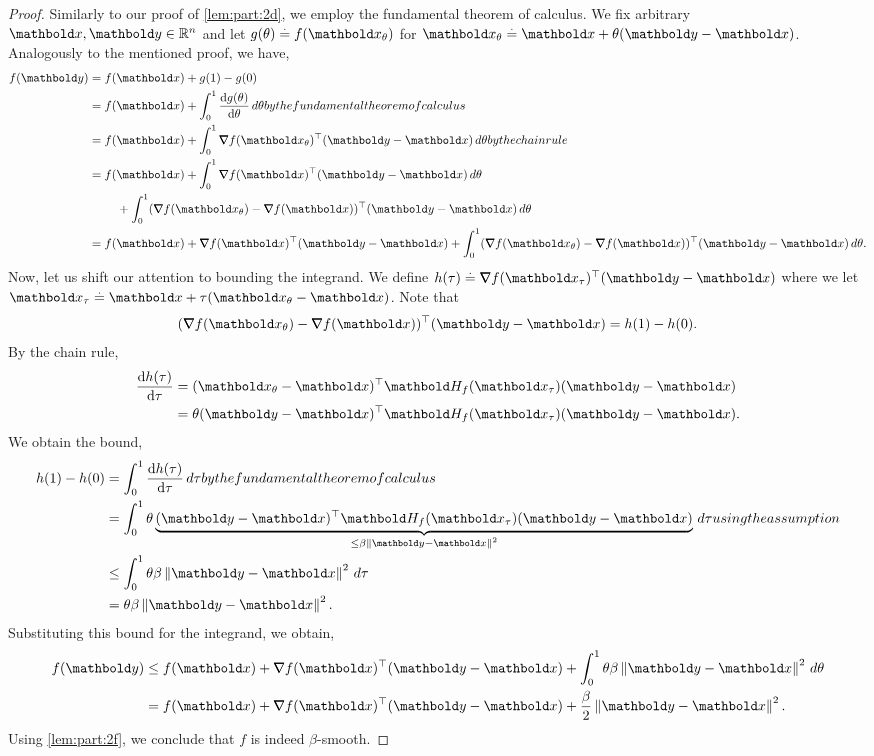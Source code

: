 \documentclass{tufte-handout}
\begin{document}
\begin{proof}
Similarly to our proof of \cref{lem:part:2d}, we employ the fundamental theorem of calculus. We fix arbitrary $\vx, \vy \in \R^n$ and let $g(\theta) \defeq f(\vx_\theta)$ for $\vx_\theta \defeq \vx + \theta(\vy - \vx)$. Analogously to the mentioned proof, we have, \begin{align*}
    f(\vy) &= f(\vx) + g(1) - g(0) \\
    &= f(\vx) + \int_0^1 \odv{g(\theta)}{\theta} \,d\theta \margintag{by the fundamental theorem of calculus} \\
    &= f(\vx) + \int_0^1 \trans{\grad f(\vx_\theta)}(\vy - \vx) \,d\theta \margintag{by the chain rule} \\
    &= \begin{multlined}[t]
        f(\vx) + \int_0^1 \trans{\grad f(\vx)}(\vy - \vx) \,d\theta \\ + \int_0^1 \trans{(\grad f(\vx_\theta) - \grad f(\vx))}(\vy - \vx) \,d\theta
    \end{multlined} \\
    &= f(\vx) + \trans{\grad f(\vx)}(\vy - \vx) + \int_0^1 \trans{(\grad f(\vx_\theta) - \grad f(\vx))}(\vy - \vx) \,d\theta.
\end{align*} Now, let us shift our attention to bounding the integrand. We define $h(\tau) \defeq \trans{\grad f(\vx_\tau)}(\vy - \vx)$ where we let $\vx_\tau \defeq \vx + \tau(\vx_\theta - \vx)$. Note that \begin{align*}
    \trans{(\grad f(\vx_\theta) - \grad f(\vx))}(\vy - \vx) = h(1) - h(0).
\end{align*} By the chain rule, \begin{align*}
    \odv{h(\tau)}{\tau} &= \trans{(\vx_\theta - \vx)} \mH_f(\vx_\tau) (\vy - \vx) \\
    &= \theta\trans{(\vy-\vx)} \mH_f(\vx_\tau) (\vy - \vx).
\end{align*} We obtain the bound, \begin{align*}
    h(1) - h(0) &= \int_0^1 \odv{h(\tau)}{\tau} \,d\tau \margintag{by the fundamental theorem of calculus} \\
    &= \int_0^1 \theta \underbrace{\trans{(\vy-\vx)} \mH_f(\vx_\tau) (\vy - \vx)}_{\leq \beta \norm{\vy - \vx}^2} \,d\tau \margintag{using the assumption} \\
    &\leq \int_0^1 \theta\beta\norm{\vy-\vx}^2 \,d\tau \\
    &= \theta\beta\norm{\vy-\vx}^2.
\end{align*} Substituting this bound for the integrand, we obtain, \begin{align*}
    f(\vy) &\leq f(\vx) + \trans{\grad f(\vx)}(\vy - \vx) + \int_0^1 \theta\beta\norm{\vy-\vx}^2 \,d\theta \\
    &= f(\vx) + \trans{\grad f(\vx)}(\vy - \vx) + \frac{\beta}{2}\norm{\vy-\vx}^2.
\end{align*} Using \cref{lem:part:2f}, we conclude that $f$ is indeed $\beta$-smooth.
\end{proof}
\end{document}
